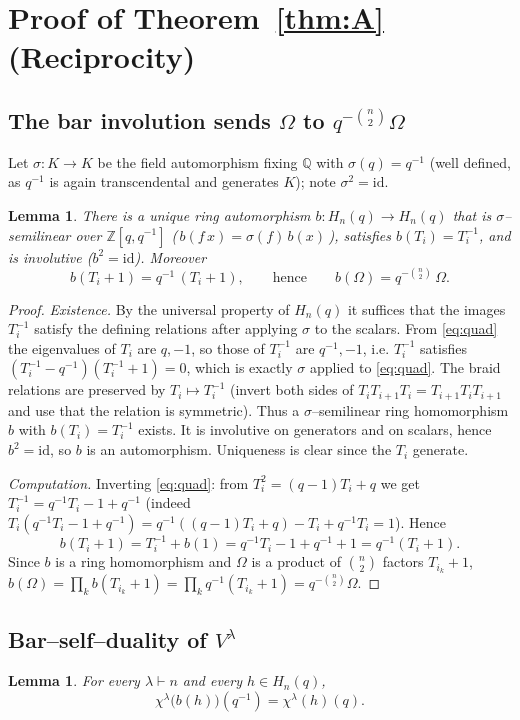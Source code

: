 \documentclass[11pt]{article}
\newtheorem{lemma}[theorem]{Lemma}
\theoremstyle{definition}
\newcommand{\Hn}{H_n(q)}
\newcommand{\qinv}{q^{-1}}
\begin{document}
\section{Proof of Theorem~\ref{thm:A} (Reciprocity)}\label{sec:A}

\subsection{The bar involution sends $\Omega$ to $q^{-\binom n2}\Omega$}
Let $\sigma\colon K\to K$ be the field automorphism fixing $\mathbb Q$ with
$\sigma(q)=\qinv$ (well defined, as $\qinv$ is again transcendental and
generates $K$); note $\sigma^2=\mathrm{id}$.

\begin{lemma}\label{lem:bar}
There is a unique ring automorphism $b\colon\Hn\to\Hn$ that is
$\sigma$--semilinear over $\mathbb Z[q,\qinv]$
(\,$b(f\,x)=\sigma(f)\,b(x)$\,), satisfies $b(T_i)=T_i^{-1}$, and is
involutive ($b^2=\mathrm{id}$). Moreover
\[
b(T_i+1)=\qinv\,(T_i+1),\qquad\text{hence}\qquad
b(\Omega)=q^{-\binom n2}\,\Omega .
\]
\end{lemma}

\begin{proof}
\emph{Existence.} By the universal property of $\Hn$ it suffices that the
images $T_i^{-1}$ satisfy the defining relations after applying $\sigma$ to
the scalars. From \eqref{eq:quad} the eigenvalues of $T_i$ are $q,-1$, so
those of $T_i^{-1}$ are $\qinv,-1$, i.e. $T_i^{-1}$ satisfies
$(T_i^{-1}-\qinv)(T_i^{-1}+1)=0$, which is exactly
$\sigma$ applied to \eqref{eq:quad}. The braid relations are preserved by
$T_i\mapsto T_i^{-1}$ (invert both sides of
$T_iT_{i+1}T_i=T_{i+1}T_iT_{i+1}$ and use that the relation is symmetric).
Thus a $\sigma$--semilinear ring homomorphism $b$ with $b(T_i)=T_i^{-1}$
exists. It is involutive on generators and on scalars, hence
$b^2=\mathrm{id}$, so $b$ is an automorphism. Uniqueness is clear since the
$T_i$ generate.

\emph{Computation.} Inverting \eqref{eq:quad}: from $T_i^2=(q-1)T_i+q$ we get
$T_i^{-1}=\qinv T_i-1+\qinv$ (indeed
$T_i(\qinv T_i-1+\qinv)=\qinv((q-1)T_i+q)-T_i+\qinv T_i=1$). Hence
\[
b(T_i+1)=T_i^{-1}+b(1)=\qinv T_i-1+\qinv+1=\qinv(T_i+1).
\]
Since $b$ is a ring homomorphism and $\Omega$ is a product of $\binom n2$
factors $T_{i_k}+1$,
$b(\Omega)=\prod_k b(T_{i_k}+1)=\prod_k\qinv(T_{i_k}+1)
=q^{-\binom n2}\Omega$.
\end{proof}

\subsection{Bar--self--duality of $V^\lambda$}
\begin{lemma}\label{lem:selfdual}
For every $\lambda\vdash n$ and every $h\in\Hn$,
\[
\chi^\lambda\!\big(b(h)\big)(\qinv)=\chi^\lambda(h)(q).
\]
\end{lemma}
\end{document}
